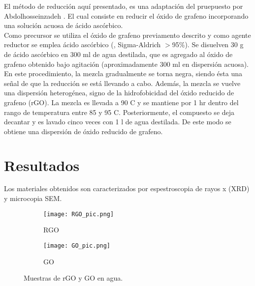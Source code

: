 El método de reducción aquí presentado, es una adaptación del pruepuesto por Abdolhosseinzadeh \citep{Abdolhosseinzadeh2015}. El cual consiste en reducir el óxido de grafeno incorporando una solución acuosa de ácido ascórbico.
\\
Como precursor se utiliza el óxido de grafeno previamento descrito y como agente reductor se emplea ácido ascórbico (, Sigma-Aldrich $>$95\%). Se disuelven 30 g de ácido ascórbico en 300 ml de agua destilada, que es agregado al óxido de grafeno obtenido bajo agitación (aproximadamente 300 ml en dispersión acuosa). En este procedimiento, la mezcla gradualmente se torna negra, siendo ésta una señal de que la reducción se está llevando a cabo. Además, la mezcla se vuelve una dispersión heterogénea, signo de la hidrofobicidad del óxido reducido de grafeno (rGO). La mezcla es llevada a 90 \degree C y se mantiene por 1 hr dentro del rango de temperatura entre 85 y 95 \degree C. Posteriormente, el compuesto se deja decantar y es lavado cinco veces con 1 l de agua destilada. De este modo se obtiene una dispersión de óxido reducido de grafeno.

\section{Resultados}
Los materiales obtenidos son caracterizados por espestroscopia de rayos x (XRD) y microcopia SEM.

\begin{figure}
	\centering
	\begin{subfigure}{0.4\textwidth}
		\texttt{[image: RGO\_pic.png]}
		\caption{RGO}
		\label{fig:RGO}
	\end{subfigure}
	\begin{subfigure}{0.42\textwidth}
		\texttt{[image: GO\_pic.png]}
		\caption{GO}
		\label{fig:GO}
	\end{subfigure}
	\caption{Muestras de rGO y GO en agua.}
\end{figure}



